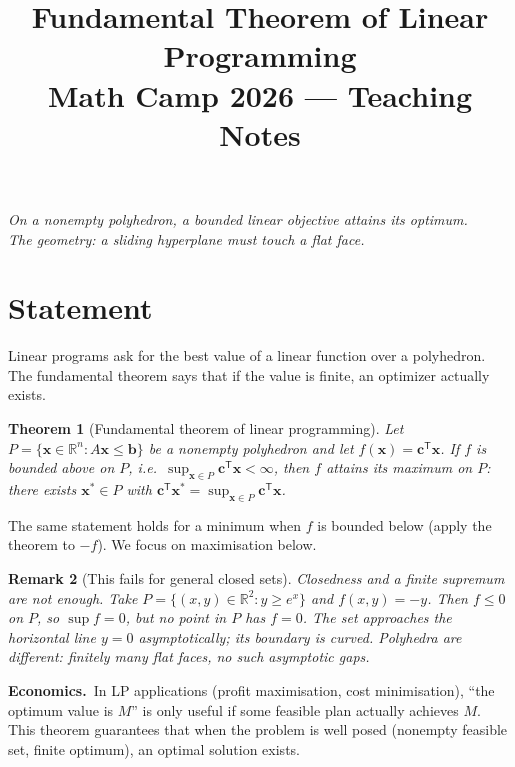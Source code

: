 \documentclass[11pt,a4paper]{article}
\title{\textbf{Fundamental Theorem of Linear Programming}\\[0.2em]
\large Math Camp 2026 --- Teaching Notes}
\author{}
\date{}
\newtheorem{theorem}{Theorem}
\newtheorem{remark}[theorem]{Remark}
\newcommand{\econ}[1]{\medskip\noindent\textbf{Economics.}\ #1\medskip}
\begin{document}
\maketitle

\begin{center}
\small
\textit{On a nonempty polyhedron, a bounded linear objective attains its optimum.\\
The geometry: a sliding hyperplane must touch a flat face.}
\end{center}

\tableofcontents
\newpage

\section{Statement}

Linear programs ask for the best value of a linear function over a polyhedron.
The fundamental theorem says that if the value is finite, an optimizer actually exists.

\begin{theorem}[Fundamental theorem of linear programming]
Let $P=\{\mathbf{x}\in\mathbb{R}^n: A\mathbf{x}\le\mathbf{b}\}$ be a nonempty polyhedron and let
$f(\mathbf{x})=\mathbf{c}^{\mathsf T}\mathbf{x}$.
If $f$ is bounded above on $P$, i.e.\ $\sup_{\mathbf{x}\in P}\mathbf{c}^{\mathsf T}\mathbf{x}<\infty$,
then $f$ attains its maximum on $P$: there exists $\mathbf{x}^*\in P$ with
$\mathbf{c}^{\mathsf T}\mathbf{x}^*=\sup_{\mathbf{x}\in P}\mathbf{c}^{\mathsf T}\mathbf{x}$.
\end{theorem}

The same statement holds for a minimum when $f$ is bounded below (apply the theorem to $-f$).
We focus on maximisation below.

\begin{remark}[This fails for general closed sets]
Closedness and a finite supremum are not enough.
Take $P=\{(x,y)\in\mathbb{R}^2: y\ge e^x\}$ and $f(x,y)=-y$.
Then $f\le 0$ on $P$, so $\sup f=0$, but no point in $P$ has $f=0$.
The set approaches the horizontal line $y=0$ asymptotically; its boundary is curved.
Polyhedra are different: finitely many flat faces, no such asymptotic gaps.
\end{remark}

\econ{In LP applications (profit maximisation, cost minimisation), ``the optimum value is $M$'' is only
useful if some feasible plan actually achieves $M$.
This theorem guarantees that when the problem is well posed (nonempty feasible set, finite optimum),
an optimal solution exists.}
\end{document}
